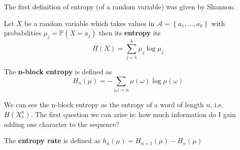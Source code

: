 The first definition of entropy (of a random variable) was given by Shannon:
\begin{definition}
    Let $X$ be a random variable which takes values in $\mathcal{A} = \left\{a_1 ,\ldots, a_k\right\}$ with probabilities $\mu_j = \mathbb{P}\left(X = a_j\right)$ then its \textbf{entropy} its
    \begin{equation*}
        H\left(X\right) = \sum_{j = 1}^k \mu_j \log \mu_j
    \end{equation*} 
\end{definition}
\begin{definition}
    The \textbf{n-block entropy} is defined as 
    \begin{equation*}
        H_n\left(\mu\right) = - \sum_{\left\lvert \omega\right\rvert = n } \mu(\omega) \log \mu(\omega)
    \end{equation*}
\end{definition}
We can see the n-block entropy as the entropy of a word of length $n$, i.e. $H\left(X_1^n\right)$.
The first question we can arise is: how much information do I gain adding one character to the sequence?
\begin{definition}
    The \textbf{entropy rate} is defined as $h_n\left(\mu\right) = H_{n+1}\left(\mu\right) - H_n\left(\mu\right)$
\end{definition}